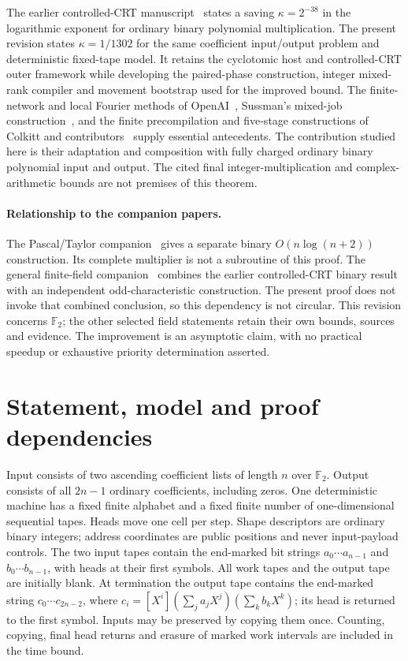 \documentclass[11pt]{article}
\newcommand{\F}{\mathbb F}
\newcommand{\Oh}{O}
\begin{document}
The earlier controlled-CRT manuscript~\cite{release} states a saving
$\kappa=2^{-38}$ in the logarithmic exponent for ordinary binary
polynomial multiplication. The present revision states $\kappa=1/1302$
for the same coefficient input/output problem and deterministic
fixed-tape model. It retains the cyclotomic host and controlled-CRT outer
framework while developing the paired-phase construction, integer
mixed-rank compiler and movement bootstrap used for the improved bound.
The finite-network and local Fourier methods of OpenAI~\cite{swap,local},
Sussman's mixed-job construction~\cite{sussman}, and the finite
precompilation and five-stage constructions of Colkitt and
contributors~\cite{mixed-precompile,five-stage} supply essential
antecedents. The contribution studied here is their adaptation and
composition with fully charged ordinary binary polynomial input and
output. The cited final integer-multiplication and complex-arithmetic
bounds are not premises of this theorem.

\paragraph{Relationship to the companion papers.}
The Pascal/Taylor companion~\cite{pascal-companion} gives a separate
binary $\Oh(n\log(n+2))$ construction. Its complete multiplier is not a
subroutine of this proof. The general finite-field
companion~\cite{general-companion} combines the earlier controlled-CRT
binary result with an independent odd-characteristic construction.
The present proof does not invoke that combined conclusion, so this
dependency is not circular. This revision concerns $\F_2$; the other
selected field statements retain their own bounds, sources and evidence.
The improvement is an asymptotic claim, with no practical speedup or
exhaustive priority determination asserted.

\section{Statement, model and proof dependencies}
Input consists of two ascending coefficient lists of length $n$ over
$\F_2$. Output consists of all $2n-1$ ordinary coefficients, including
zeros. One deterministic machine has a fixed finite alphabet and a fixed
finite number of one-dimensional sequential tapes. Heads move one cell
per step. Shape descriptors are ordinary binary integers; address
coordinates are public positions and never input-payload controls.
The two input tapes contain the end-marked bit strings
$a_0\cdots a_{n-1}$ and $b_0\cdots b_{n-1}$, with heads at their
first symbols. All work tapes and the output tape are initially blank.
At termination the output tape contains the end-marked string
$c_0\cdots c_{2n-2}$, where
$c_i=[X^i](\sum_j a_jX^j)(\sum_k b_kX^k)$; its head is returned
to the first symbol. Inputs may be preserved by copying them once.
Counting, copying, final head returns and erasure of marked work
intervals are included in the time bound.
\end{document}
